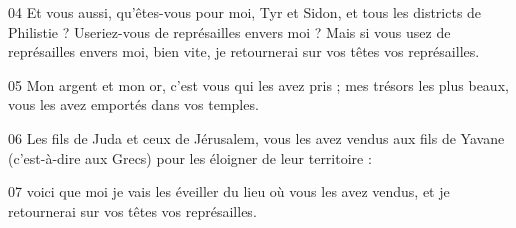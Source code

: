 
04 Et vous aussi, qu’êtes-vous pour moi, Tyr et Sidon, et tous les districts de Philistie ? Useriez-vous de représailles envers moi ? Mais si vous usez de représailles envers moi, bien vite, je retournerai sur vos têtes vos représailles.

05 Mon argent et mon or, c’est vous qui les avez pris ; mes trésors les plus beaux, vous les avez emportés dans vos temples.

06 Les fils de Juda et ceux de Jérusalem, vous les avez vendus aux fils de Yavane (c’est-à-dire aux Grecs) pour les éloigner de leur territoire :

07 voici que moi je vais les éveiller du lieu où vous les avez vendus, et je retournerai sur vos têtes vos représailles.
